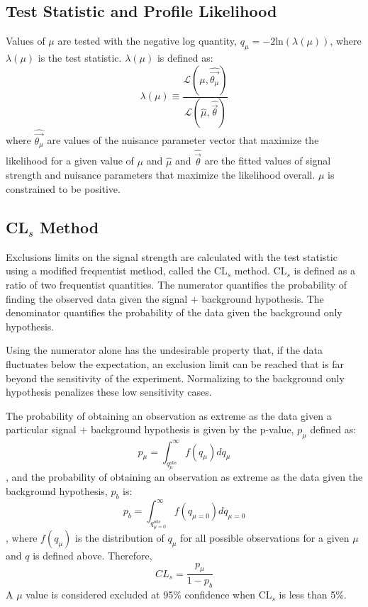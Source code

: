 \subsection{Test Statistic and Profile Likelihood}

Values of $\mu$ are tested with the negative log quantity, $q_{\mu}= -2$ln$(\lambda(\mu))$, where $\lambda(\mu)$ is the test statistic.
$\lambda(\mu)$ is defined as:
\begin{equation}
\lambda(\mu) \equiv \frac{\mathcal{L}(\mu,\hat{\vec{\theta_{\mu}}})}{\mathcal{L}(\hat{\mu},\hat{\vec{\theta}})}
\end{equation}
where $\hat{\vec{\theta_{\mu}}}$ are values of the nuisance parameter vector that maximize the likelihood for a given value of $\mu$ and $\hat{\mu}$ and $\hat{\vec{\theta}}$ are the fitted values of signal strength and nuisance parameters that maximize the likelihood overall. $\mu$ is constrained to be positive.  

\subsection{ CL$_{s}$ Method}

Exclusions limits on the signal strength are calculated with the test statistic using a modified frequentist method, called the CL$_{s}$ method\cite{0954-3899-28-10-313}. CL$_{s}$ is defined as a ratio of two frequentist quantities. The numerator quantifies the probability of finding the observed data given the signal $+$ background hypothesis. The denominator quantifies the probability of the data given the background only hypothesis.

Using the numerator alone has the undesirable property that, if the data fluctuates below the expectation, an exclusion limit can be reached that is far beyond the sensitivity of the experiment. Normalizing to the background only hypothesis penalizes these low sensitivity cases.

The probability of obtaining an observation as extreme as the data given a particular signal $+$ background hypothesis is given by the p-value, $p_{\mu}$ defined as:
\begin{equation}
 p_{\mu} = \int_{q_{\mu}^{obs}}^{\infty} f(q_{\mu}) dq_{\mu}
\end{equation}
, and the probability of obtaining an observation as extreme as the data given the background hypothesis, $p_b$ is:
\begin{equation}
 p_{b} = \int_{q_{\mu=0}^{obs}}^{\infty} f(q_{\mu=0}) dq_{\mu=0}
\end{equation}
, where $f(q_{\mu})$ is the distribution of $q_{\mu}$ for all possible observations for a given $\mu$ and $q$ is defined above. Therefore,
\begin{equation}
 CL_{s} = \frac{p_{\mu}}{1-p_b}
\end{equation}
A $\mu$ value is considered excluded at 95\% confidence when CL$_{s}$ is less than 5\%. 

